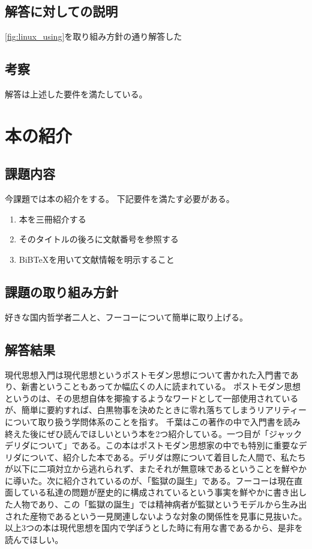 \documentclass[fontsize = 14pt, paper= a4]{jlreq}
\begin{document}
\subsection{解答に対しての説明}
\ref{fig:linux_using}を取り組み方針の通り解答した
\subsection{考察}
解答は上述した要件を満たしている。

\section{本の紹介}
\subsection{課題内容}
今課題では本の紹介をする。
下記要件を満たす必要がある。
\begin{enumerate}
\item 本を三冊紹介する
\item そのタイトルの後ろに文献番号を参照する
\item BiBTeXを用いて文献情報を明示すること
\end{enumerate}

\subsection{課題の取り組み方針}
好きな国内哲学者二人と、フーコーについて簡単に取り上げる。

\subsection{解答結果}

現代思想入門\cite{chiba}は現代思想というポストモダン思想について書かれた入門書であり、新書ということもあってか幅広くの人に読まれている。
ポストモダン思想というのは、その思想自体を揶揄するようなワードとして一部使用されているが、簡単に要約すれば、白黒物事を決めたときに零れ落ちてしまうリアリティーについて取り扱う学問体系のことを指す。
千葉はこの著作の中で入門書を読み終えた後にぜひ読んでほしいという本を2つ紹介している。一つ目が「ジャックデリダについて」\cite{azuma}である。この本はポストモダン思想家の中でも特別に重要なデリダについて、紹介した本である。デリダは際について着目した人間で、私たちが以下に二項対立から逃れられず、またそれが無意味であるということを鮮やかに導いた。次に紹介されているのが、「監獄の誕生」\cite{foo-koo}である。フーコーは現在直面している私達の問題が歴史的に構成されているという事実を鮮やかに書き出した人物であり、この「監獄の誕生」では精神病者が監獄というモデルから生み出された産物であるという一見関連しないような対象の関係性を見事に見抜いた。以上3つの本は現代思想を国内で学ぼうとした時に有用な書であるから、是非を読んでほしい。
\end{document}
